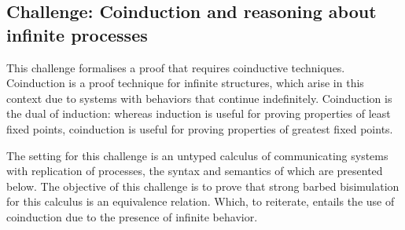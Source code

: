 \subsection{Challenge: Coinduction and reasoning about infinite processes}
\label{sec:challenge:coinduction}

This challenge formalises a proof that requires coinductive techniques.
Coinduction is a proof technique for infinite structures, which arise in this context due to systems with behaviors that continue indefinitely.
Coinduction is the dual of induction: whereas induction is useful for proving properties of least fixed points, coinduction is useful for proving properties of greatest fixed points.

The setting for this challenge is an untyped calculus of communicating systems with replication of processes, the syntax and semantics of which are presented below.
The objective of this challenge is to prove that strong barbed bisimulation for this calculus is an equivalence relation. Which, to reiterate, entails the use of coinduction due to the presence of infinite behavior.

